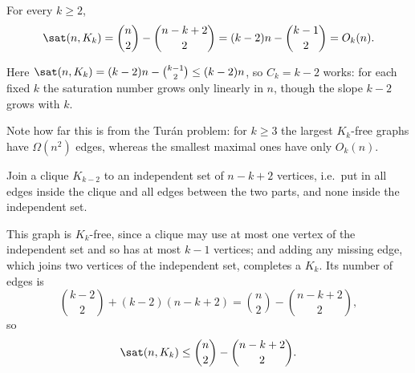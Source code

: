 \begin{theorem}[Bollob\'as, 1965]\label{thm:sat}
    For every \(k \ge 2\),
    \[
        \sat(n, K_k) = \binom{n}{2} - \binom{n-k+2}{2} = (k-2)n - \binom{k-1}{2} = O_k(n).
    \]
\end{theorem}

Here \(\sat(n, K_k) = (k-2)n - \binom{k-1}{2} \le (k-2) n\), so \(C_k = k-2\) works: for each fixed \(k\) the saturation number grows only linearly in \(n\), though the slope \(k-2\) grows with \(k\).

\begin{remark}
    Note how far this is from the Tur\'an problem: for \(k \ge 3\) the largest \(K_k\)-free graphs have \(\Omega(n^2)\) edges, whereas the smallest maximal ones have only \(O_k(n)\).
\end{remark}

\begin{remark}\label{rmk:sat-sharp}
    Join a clique \(K_{k-2}\) to an independent set of \(n-k+2\) vertices, i.e.\ put in all edges inside the clique and all edges between the two parts, and none inside the independent set.
    \begin{center}
    \end{center}
    This graph is \(K_k\)-free, since a clique may use at most one vertex of the independent set and so has at most \(k-1\) vertices; and adding any missing edge, which joins two vertices of the independent set, completes a \(K_k\). Its number of edges is
    \[
        \binom{k-2}{2} + (k-2)(n-k+2) = \binom{n}{2} - \binom{n-k+2}{2},
    \]
    so
    \[
        \sat(n, K_k) \le \binom{n}{2} - \binom{n-k+2}{2}.
    \]
\end{remark}

